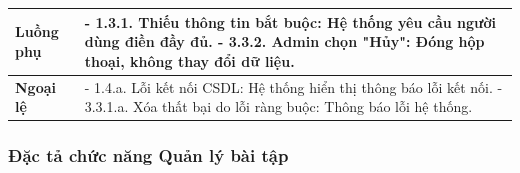 \documentclass[../main.tex]{subfiles}
\begin{document}
{\begin{tabularx}{\textwidth}{|p{3.5cm}|>{\raggedright\arraybackslash}X|}
\hline
\textbf{Luồng phụ} & - 1.3.1. Thiếu thông tin bắt buộc: Hệ thống yêu cầu người dùng điền đầy đủ. \newline - 3.3.2. Admin chọn "Hủy": Đóng hộp thoại, không thay đổi dữ liệu. \\
\hline
\textbf{Ngoại lệ} & - 1.4.a. Lỗi kết nối CSDL: Hệ thống hiển thị thông báo lỗi kết nối. \newline - 3.3.1.a. Xóa thất bại do lỗi ràng buộc: Thông báo lỗi hệ thống. \\
\hline
\end{tabularx}
}

\subsubsection{Đặc tả chức năng Quản lý bài tập}
\end{document}
